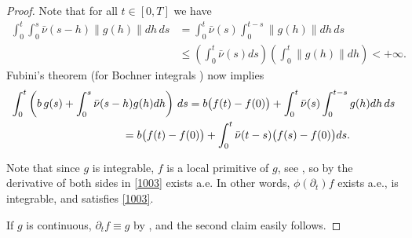\documentclass[reqno]{amsart}
\theoremstyle{remark}
\numberwithin{equation}{section} %
\newcommand{\1}{\mathds{1}}
\begin{document}
	\begin{proof}
		Note that for all $t\in[0,T]$ we have
		\begin{align}
			\int_0^t\int_0^s\bar{\nu}(s-h)\|g(h)\|dh\,ds&=\int_0^t \bar\nu(s)\int_0^{t-s}\|g(h)\|dh\, ds\\
			&\le \left(\int_0^t \bar\nu(s)ds\right)\left(\int_0^{t}\|g(h)\|dh\right)<+\infty.
		\end{align}
		Fubini's theorem (for Bochner integrals \cite[Theorem 3.7.13]{hille1996functional}) now implies
		\begin{align}
			\begin{split}\label{1003}
				\int_0^t\left(b\,g(s)+\int_0^s\bar{\nu}(s-h)g(h)dh\right)\,ds&=b\big(f(t)-f(0)\big)+\int_0^t\bar\nu(s)\int_0^{t-s}g(h)dh\,ds\\&\hspace{-6em}=b\big(f(t)-f(0)\big)+\int_0^t \bar\nu(t-s)\big(f(s)-f(0)\big)ds.
			\end{split}
		\end{align}
		
		Note that since $g$ is integrable, $f$ is a local primitive of $g$, see \cite[Theorem 3.3 in Chapter XIII]{Bochner}, so by \cite[Theorem 3.4 in Chapter XIII]{Bochner} the derivative of both sides in \eqref{1003} exists a.e. In other words, $\phi(\partial_t)f$ exists a.e., is integrable, and satisfies \eqref{1003}.
		
		If $g$ is continuous, $\partial_t f\equiv g$ by \cite[Theorem 2.2 in Chapter XIII]{Bochner}, and the second claim easily follows.
	\end{proof}
	
	
	
\end{document}
